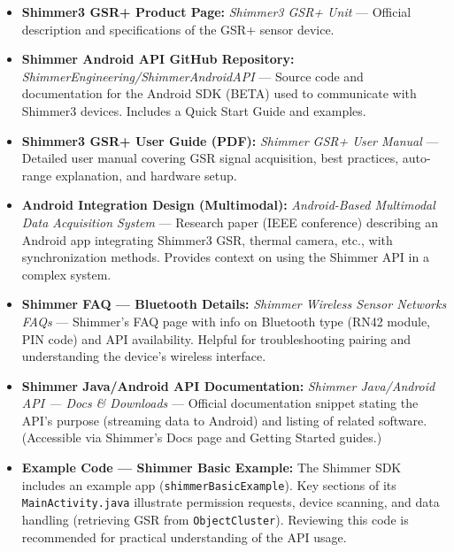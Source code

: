{{\begin{itemize}
\item \textbf{Shimmer3 GSR+ Product Page:} \textit{Shimmer3 GSR+ Unit} --- Official
  description and specifications of the GSR+ sensor
  device\cite{Boucsein2012}\cite{AppleHealthWatch2019}.
\item \textbf{Shimmer Android API GitHub Repository:}
  \textit{ShimmerEngineering/ShimmerAndroidAPI} --- Source code and
  documentation for the Android SDK (BETA) used to communicate with
  Shimmer3
  devices\cite{GSRFacialThermal2021}.
  Includes a Quick Start Guide and examples.
\item \textbf{Shimmer3 GSR+ User Guide (PDF):} \textit{Shimmer GSR+ User Manual} ---
  Detailed user manual covering GSR signal acquisition, best practices,
  auto-range explanation, and hardware
  setup\cite{WebcamCapture}\cite{ShimmerManager}.
\item \textbf{Android Integration Design (Multimodal):} \textit{Android-Based Multimodal
  Data Acquisition System} --- Research paper (IEEE conference)
  describing an Android app integrating Shimmer3 GSR, thermal camera,
  etc., with synchronization
  methods\cite{DeviceServer}\cite{DeviceServer}.
  Provides context on using the Shimmer API in a complex system.
\item \textbf{Shimmer FAQ --- Bluetooth Details:} \textit{Shimmer Wireless Sensor
  Networks FAQs} --- Shimmer's FAQ page with info on Bluetooth type (RN42
  module, PIN code) and API
  availability\cite{StressDefinitionHH}\cite{ElectrodermalActivityWiki}.
  Helpful for troubleshooting pairing and understanding the device's
  wireless interface.
\item \textbf{Shimmer Java/Android API Documentation:} \textit{Shimmer Java/Android API
  --- Docs & Downloads} --- Official documentation snippet stating the
  API's purpose (streaming data to Android) and listing of related
  software. (Accessible via Shimmer's Docs page and Getting Started
  guides.)
\item \textbf{Example Code --- Shimmer Basic Example:} The Shimmer SDK includes an
  example app (\texttt{shimmerBasicExample}). Key sections of its
  \texttt{MainActivity.java} illustrate permission
  requests\cite{ElectrodermalActivityWiki},
  device
  scanning\cite{DeviceServer},
  and data handling (retrieving GSR from
  \texttt{ObjectCluster})\cite{ContactlessStressThermal2022}\cite{InstantStressSmartphone2019}.
  Reviewing this code is recommended for practical understanding of the
  API usage.


\end{itemize}}}
